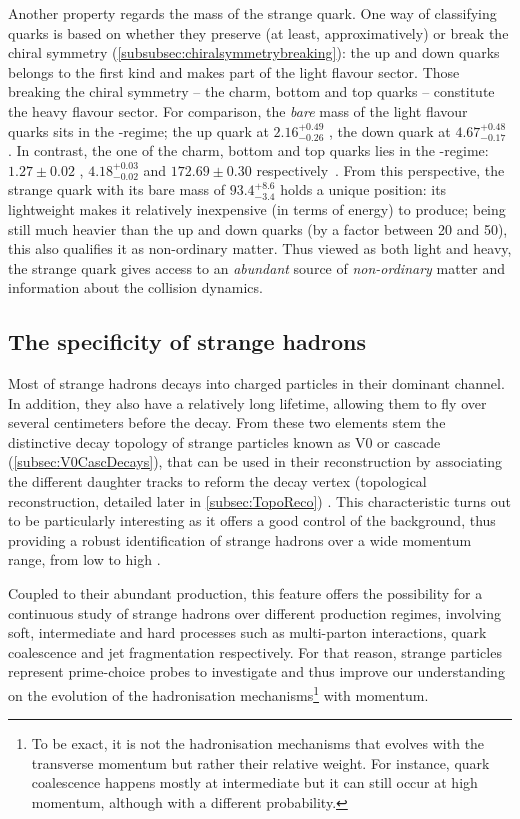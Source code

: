 Another property regards the mass of the strange quark. One way of classifying quarks is based on whether they preserve (at least, approximatively) or break the chiral symmetry (\Sec\ref{subsubsec:chiralsymmetrybreaking}): the up and down quarks belongs to the first kind and makes part of the light flavour sector. Those breaking the chiral symmetry -- the charm, bottom and top quarks -- constitute the heavy flavour sector. For comparison, the \emph{bare} mass of the light flavour quarks sits in the \mmass-regime; the up quark at $2.16_{-0.26}^{+0.49}$ \mmass, the down quark at $4.67_{-0.17}^{+0.48}$ \mmass. In contrast, the one of the charm, bottom and top quarks lies in the \gmass-regime: $1.27 \pm 0.02$ \gmass, $4.18_{-0.02}^{+0.03}$ \gmass and $172.69 \pm 0.30$ \gmass respectively~\cite{particledatagroupReviewParticlePhysics2022}. From this perspective, the strange quark with its bare mass of $93.4_{-3.4}^{+8.6}$ \mmass holds a unique position: its lightweight makes it relatively inexpensive (in terms of energy) to produce; being still much heavier than the up and down quarks (by a factor between 20 and 50), this also qualifies it as non-ordinary matter. Thus viewed as both light and heavy, the strange quark gives access to an \emph{abundant} source of \emph{non-ordinary} matter and information about the collision dynamics.


\subsection{The specificity of strange hadrons}
\label{subsec:SpecStrangeHadrons}

Most of strange hadrons decays into charged particles in their dominant channel. In addition, they also have a relatively long lifetime, allowing them to fly over several centimeters before the decay. From these two elements stem the distinctive decay topology of strange particles known as V0 or cascade (\Sec\ref{subsec:V0CascDecays}), that can be used in their reconstruction by associating the different daughter tracks to reform the decay vertex (topological reconstruction, detailed later in \Sec\ref{subsec:TopoReco}) \cite{speltzCaracterisationEtatDense2006}. This characteristic turns out to be particularly interesting as it offers a good control of the background, thus providing a robust identification of strange hadrons over a wide momentum range, from low to high \pT.

Coupled to their abundant production, this feature offers the possibility for a continuous study of strange hadrons over different production regimes, involving soft, intermediate and hard processes such as multi-parton interactions, quark coalescence and jet fragmentation respectively. For that reason, strange particles represent prime-choice probes to investigate and thus improve our understanding on the evolution of the hadronisation mechanisms\footnote{To be exact, it is not the hadronisation mechanisms that evolves with the transverse momentum but rather their relative weight. For instance, quark coalescence happens mostly at intermediate \pT but it can still occur at high momentum, although with a different probability.} with momentum.

